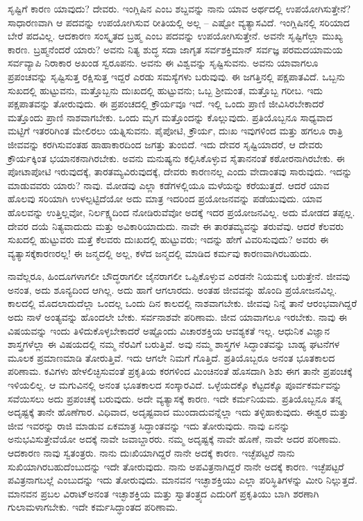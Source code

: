 ಸೃಷ್ಟಿಗೆ ಕಾರಣ ಯಾವುದು? ದೇವರು. ಇಂಗ್ಲಿಷಿನ  ಎಂಬ ಶಬ್ದವನ್ನು ನಾನು ಯಾವ ಅರ್ಥದಲ್ಲಿ ಉಪಯೋಗಿಸುತ್ತೇನೆ? ಸಾಧಾರಣವಾಗಿ ಆ ಪದವನ್ನು ಉಪಯೋಗಿಸುವ ರೀತಿಯಲ್ಲಿ ಅಲ್ಲ – ಎಷ್ಟೋ ವ್ಯತ್ಯಾಸವಿದೆ. ಇಂಗ್ಲಿಷಿನಲ್ಲಿ ಸರಿಯಾದ ಬೇರೆ ಪದವಿಲ್ಲ. ಆದಕಾರಣ ಸಂಸ್ಕೃತದ ಬ್ರಹ್ಮ ಎಂಬ ಪದವನ್ನು ಉಪಯೋಗಿಸುತ್ತೇನೆ. ಅವನೇ ಸೃಷ್ಟಿಗೆಲ್ಲಾ ಮುಖ್ಯ ಕಾರಣ. ಬ್ರಹ್ಮನೆಂದರೆ ಯಾರು? ಅವನು ನಿತ್ಯ ಶುದ್ಧ ಸದಾ ಜಾಗೃತ ಸರ್ವಶಕ್ತಿಮಾನ್​ ಸರ್ವಜ್ಞ ಪರಮದಯಾಮಯ ಸರ್ವವ್ಯಾಪಿ ನಿರಾಕಾರ ಅಖಂಡ ಸ್ವರೂಪನು. ಅವನು ಈ ವಿಶ್ವವನ್ನು ಸೃಷ್ಟಿಸುವನು. ಅವನು ಯಾವಾಗಲೂ ಪ್ರಪಂಚವನ್ನು ಸೃಷ್ಟಿಸುತ್ತ ರಕ್ಷಿಸುತ್ತ ಇದ್ದರೆ ಎರಡು ಸಮಸ್ಯೆಗಳು ಬರುವುವು. ಈ ಜಗತ್ತಿನಲ್ಲಿ ಪಕ್ಷಪಾತವಿದೆ. ಒಬ್ಬನು ಸುಖದಲ್ಲಿ ಹುಟ್ಟುವನು, ಮತ್ತೊಬ್ಬನು ದುಃಖದಲ್ಲಿ ಹುಟ್ಟುವನು; ಒಬ್ಬ ಶ‍್ರೀಮಂತ, ಮತ್ತೊಬ್ಬ ಗರೀಬ. ಇದು ಪಕ್ಷಪಾತವನ್ನು ತೋರುವುದು. ಈ ಪ್ರಪಂಚದಲ್ಲಿ ಕ್ರೌರ್ಯವೂ ಇದೆ. ಇಲ್ಲಿ ಒಂದು ಪ್ರಾಣಿ ಜೀವಿಸಿರಬೇಕಾದರೆ ಮತ್ತೊಂದು ಪ್ರಾಣಿ ನಾಶವಾಗಬೇಕು. ಒಂದು ಮೃಗ ಮತ್ತೊಂದನ್ನು ಕೊಲ್ಲುವುದು. ಪ್ರತಿಯೊಬ್ಬನೂ ಸಾಧ್ಯವಾದ ಮಟ್ಟಿಗೆ ಇತರರಿಗಿಂತ ಮೇಲಿರಲು ಯತ್ನಿಸುವನು. ಪೈಪೋಟಿ, ಕ್ರೌರ್ಯ, ದುಃಖ ಇವುಗಳಿಂದ ಮತ್ತು ಹಗಲೂ ರಾತ್ರಿ ಜೀವವನ್ನು ಕರಗಿಸುವಂತಹ ಹಾಹಾಕಾರದಿಂದ ಜಗತ್ತು ತುಂಬಿದೆ. ಇದು ದೇವರ ಸೃಷ್ಟಿಯಾದರೆ, ಆ ದೇವರು ಕ್ರೌರ್ಯಕ್ಕಿಂತ ಭಯಾನಕನಾಗಿರಬೇಕು. ಅವನು ಮನುಷ್ಯನು ಕಲ್ಪಿಸಿಕೊಳ್ಳುವ ಸೈತಾನನಂತೆ ಕಠೋರನಾಗಿರಬೇಕು. ಈ ಪೋಟಾಪೋಟಿ ಇರುವುದಕ್ಕೆ, ತಾರತಮ್ಯವಿರುವುದಕ್ಕೆ, ದೇವರು ಕಾರಣನಲ್ಲ ಎಂದು ವೇದಾಂತವು ಸಾರುವುದು. ಇದನ್ನು ಮಾಡುವವರು ಯಾರು? ನಾವು. ಮೋಡವು ಎಲ್ಲಾ ಕಡೆಗಳಲ್ಲಿಯೂ ಮಳೆಯನ್ನು ಕರೆಯುತ್ತದೆ. ಆದರೆ ಯಾವ ಹೊಲವು ಸರಿಯಾಗಿ ಉಳಲ್ಪಟ್ಟಿದೆಯೋ ಅದು ಮಾತ್ರ ಇದರಿಂದ ಪ್ರಯೋಜನವನ್ನು ಪಡೆಯುವುದು. ಯಾವ ಹೊಲವನ್ನು ಉತ್ತಿಲ್ಲವೋ, ನಿರ್ಲಕ್ಷ್ಯದಿಂದ ನೋಡಿರುವೆವೋ ಅದಕ್ಕೆ ಇದರ ಪ್ರಯೋಜನವಿಲ್ಲ. ಅದು ಮೋಡದ ತಪ್ಪಲ್ಲ. ದೇವರ ದಯೆ ನಿತ್ಯವಾದುದು ಮತ್ತು ಅವಿಕಾರಿಯಾದುದು. ನಾವೇ ಈ ತಾರತಮ್ಯವನ್ನು ತರುವೆವು. ಆದರೆ ಕೆಲವರು ಸುಖದಲ್ಲಿ ಹುಟ್ಟುವರು ಮತ್ತೆ ಕೆಲವರು ದುಃಖದಲ್ಲಿ ಹುಟ್ಟುವರು; ಇದನ್ನು ಹೇಗೆ ವಿವರಿಸುವುದು? ಅವರು ಈ ವ್ಯತ್ಯಾಸಕ್ಕೆ\break ಕಾರಣರಲ್ಲ! ಈ ಜನ್ಮದಲ್ಲಿ ಅಲ್ಲ, ಕಳೆದ ಜನ್ಮದಲ್ಲಿ ಮಾಡಿದ ಕರ್ಮವು ಕಾರಣವಾಗಿರಬಹುದು. 

ನಾವೆಲ್ಲರೂ, ಹಿಂದೂಗಳಾಗಲೀ ಬೌದ್ಧರಾಗಲೀ ಜೈನರಾಗಲೀ ಒಪ್ಪಿ\-ಕೊಳ್ಳುವ ಎರಡನೇ ನಿಯಮಕ್ಕೆ ಬರುತ್ತೇನೆ. ಜೀವವು ಅನಂತ, ಅದು ಶೂನ್ಯದಿಂದ ಆಗಿಲ್ಲ. ಅದು ಹಾಗೆ ಆಗಲಾರದು. ಅಂತಹ ಜೀವವನ್ನು ಹೊಂದಿ ಪ್ರಯೋಜನವಿಲ್ಲ. ಕಾಲದಲ್ಲಿ ಮೊದಲಾದುದೆಲ್ಲಾ ಒಂದಲ್ಲ ಒಂದು ದಿನ ಕಾಲದಲ್ಲಿ ನಾಶವಾಗಬೇಕು. ಜೀವವು ನಿನ್ನೆ ತಾನೆ ಆರಂಭವಾಗಿದ್ದರೆ ಅದು ನಾಳೆ ಅಂತ್ಯವನ್ನು ಹೊಂದಲೇ ಬೇಕು. ಸರ್ವನಾಶವೇ ಪರಿಣಾಮ. ಜೀವ ಯಾವಾಗಲೂ ಇರಬೇಕು. ನಾವು ಈ ವಿಷಯವನ್ನು ಇಂದು ತಿಳಿದುಕೊಳ್ಳಬೇಕಾದರೆ ಅಷ್ಟೊಂದು ವಿಚಾರಶಕ್ತಿಯ ಆವಶ್ಯಕತೆ ಇಲ್ಲ. ಆಧುನಿಕ ವಿಜ್ಞಾನ ಶಾಸ್ತ್ರಗಳೆಲ್ಲಾ ಈ ವಿಷಯದಲ್ಲಿ ನಮ್ಮ ನೆರವಿಗೆ ಬರುತ್ತಿವೆ. ಅವು ನಮ್ಮ ಶಾಸ್ತ್ರಗಳ ಸಿದ್ಧಾಂತವನ್ನು ಬಾಹ್ಯ ಘಟನೆಗಳ ಮೂಲಕ ಪ್ರಮಾಣಮಾಡಿ ತೋರುತ್ತಿವೆ. ಇದು ಆಗಲೇ ನಿಮಗೆ ಗೊತ್ತಿದೆ. ಪ್ರತಿಯೊಬ್ಬರೂ ಅನಂತ ಭೂತಕಾಲದ ಪರಿಣಾಮ. ಕವಿಗಳು ಹೇಳಲಿಚ್ಛಿಸುವಂತೆ ಪ್ರಕೃತಿಯ ಕರಗಳಿಂದ ಮಿಂಚಿನಂತೆ ಹೊಸದಾಗಿ ಶಿಶು ಈಗ ತಾನೇ ಪ್ರಪಂಚಕ್ಕೆ ಇಳಿಯಲಿಲ್ಲ. ಆ ಮಗುವಿನಲ್ಲಿ ಅನಂತ ಭೂತಕಾಲದ ಸಂಸ್ಕಾರವಿದೆ. ಒಳ್ಳೆಯದಕ್ಕೊ ಕೆಟ್ಟದಕ್ಕೊ ಪೂರ್ವಕರ್ಮವನ್ನು ಸವೆಯಿಸಲು ಅದು ಪ್ರಪಂಚಕ್ಕೆ ಬರುವುದು. ಅದೇ ವ್ಯತ್ಯಾಸಕ್ಕೆ ಕಾರಣ. ಇದೇ ಕರ್ಮನಿಯಮ. ಪ್ರತಿಯೊಬ್ಬನೂ ತನ್ನ ಅದೃಷ್ಟಕ್ಕೆ ತಾನೇ ಹೊಣೆಗಾರ. ವಿಧಿವಾದ, ಅದೃಷ್ಟವಾದ ಮುಂದಾದುವನ್ನೆಲ್ಲಾ ಇದು ತಳ್ಳಿಹಾಕುವುದು. ಈಶ್ವರ ಮತ್ತು ಜೀವ ಇವರನ್ನು ರಾಜಿ ಮಾಡುವ ಏಕಮಾತ್ರ ಸಿದ್ಧಾಂತವನ್ನು ಇದು ತೋರುವುದು. ನಾವು ಏನನ್ನು ಅನುಭವಿಸುತ್ತೇವೆಯೋ ಅದಕ್ಕೆ ನಾವೇ ಜವಾಬ್ದಾರರು. ನಮ್ಮ ಅದೃಷ್ಟಕ್ಕೆ ನಾವೇ ಹೊಣೆ, ನಾವೇ ಅದರ ಪರಿಣಾಮ. ಆದಕಾರಣ ನಾವು ಸ್ವತಂತ್ರರು. ನಾನು ದುಃಖಿಯಾಗಿದ್ದರೆ ನಾನೇ ಅದಕ್ಕೆ ಕಾರಣ. ಇಚ್ಛೆಪಟ್ಟರೆ ನಾನು ಸುಖಿಯಾಗಿರಬಹುದೆಂಬುದನ್ನು ಇದೇ ತೋರುವುದು. ನಾನು ಅಪವಿತ್ರನಾಗಿದ್ದರೆ ನಾನೇ ಅದಕ್ಕೆ ಕಾರಣ. ಇಚ್ಛೆಪಟ್ಟರೆ ಪವಿತ್ರನಾಗಬಲ್ಲೆ ಎಂಬುದನ್ನು ಇದು ತೋರುವುದು. ಮಾನವನ ಇಚ್ಛಾಶಕ್ತಿಯು ಎಲ್ಲಾ ಪರಿಸ್ಥಿತಿಗಳನ್ನು ಮೀರಿ ನಿಲ್ಲುತ್ತದೆ. ಮಾನವನ ಪ್ರಬಲ ವಿರಾಟ್​ ಅನಂತ ಇಚ್ಛಾಶಕ್ತಿಯ ಮತ್ತು ಸ್ವಾತಂತ್ರ್ಯದ ಎದುರಿಗೆ ಪ್ರಕೃತಿಯು ಬಾಗಿ ಶರಣಾಗಿ ಗುಲಾಮಳಾಗಬೇಕು. ಇದೇ ಕರ್ಮಸಿದ್ಧಾಂತದ ಪರಿಣಾಮ. 

